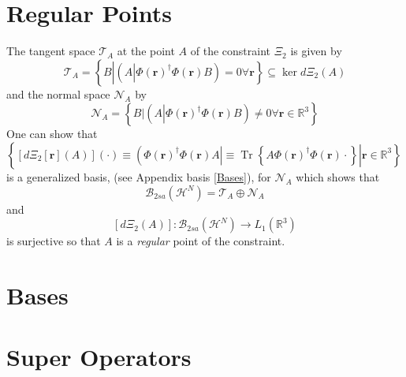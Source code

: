 \documentclass[aps,preprint]{revtex4}%
\begin{document}
\section{Regular Points \label{Regular}}

The tangent space $\mathcal{T}_{A}$ at the point $A$ of the constraint
$\Xi_{2}$ is given by
\begin{equation}
\mathcal{T}_{A}=\left\{  B\left\vert \left(  A\left\vert \Phi\left(
\boldsymbol{r}\right)  ^{\dagger}\Phi\left(  \boldsymbol{r}\right)  \right.
B\right)  =0\forall\boldsymbol{r}\right.  \right\}  \subseteq\ker d\Xi
_{2}\left(  A\right)
\end{equation}
and the normal space $\mathcal{N}_{A}$ by
\begin{equation}
\mathcal{N}_{A}=\left\{  \left.  B\right\vert \left(  A\left\vert \Phi\left(
\boldsymbol{r}\right)  ^{\dagger}\Phi\left(  \boldsymbol{r}\right)  \right.
B\right)  \neq0\forall\boldsymbol{r\in}\mathbb{R}^{3}\right\}
\end{equation}
One can show that $\left\{  \left.  \left[  d\Xi_{2}\left[  \boldsymbol{r}%
\right]  \left(  A\right)  \right]  \left(  \cdot\right)  \equiv\left(
\Phi\left(  \boldsymbol{r}\right)  ^{\dagger}\Phi\left(  \boldsymbol{r}%
\right)  A\right\vert \equiv\operatorname{Tr}\left\{  A\Phi\left(
\boldsymbol{r}\right)  ^{\dagger}\Phi\left(  \boldsymbol{r}\right)
\cdot\right\}  \right\vert \boldsymbol{r\in}\mathbb{R}^{3}\right\}  $ is a
generalized basis, (see Appendix basis \ref{Bases}), for $\mathcal{N}_{A}$
which shows that
\begin{equation}
\mathcal{B}_{2sa}\left(  \mathcal{H}^{N}\right)  =\mathcal{T}_{A}%
\oplus\mathcal{N}_{A}%
\end{equation}
and
\begin{equation}
\left[  d\Xi_{2}\left(  A\right)  \right]  :\mathcal{B}_{2sa}\left(
\mathcal{H}^{N}\right)  \rightarrow L_{1}\left(  \mathbb{R}^{3}\right)
\end{equation}
is surjective so that $A$ is a \emph{regular }\cite{Hestenes}\emph{ }point of
the constraint.

\section{Bases \label{Bases}}

\section{Super Operators \label{super}}
\end{document}
